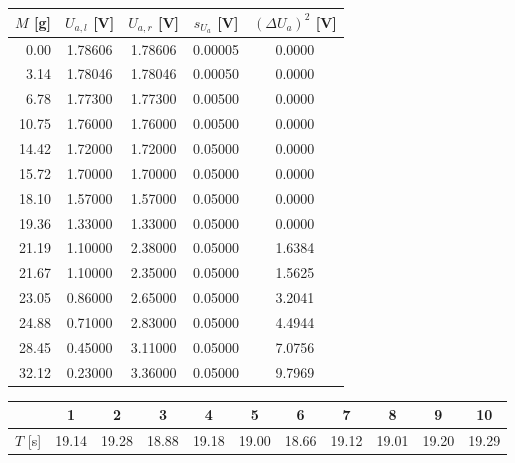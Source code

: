 \begin{center}
    \begin{tabular}{r|cccc}
        $M$ [g] &  $U_{a,l}$ [V] &  $U_{a,r}$ [V] &  $s_{U_a}$ [V] &  $(\Delta U_a)^2$ [V] \\
        \hline
         0.00 &  1.78606 &  1.78606 &  0.00005 &   0.0000 \\
         3.14 &  1.78046 &  1.78046 &  0.00050 &   0.0000 \\
         6.78 &  1.77300 &  1.77300 &  0.00500 &   0.0000 \\
        10.75 &  1.76000 &  1.76000 &  0.00500 &   0.0000 \\
        14.42 &  1.72000 &  1.72000 &  0.05000 &   0.0000 \\
        15.72 &  1.70000 &  1.70000 &  0.05000 &   0.0000 \\
        18.10 &  1.57000 &  1.57000 &  0.05000 &   0.0000 \\
        19.36 &  1.33000 &  1.33000 &  0.05000 &   0.0000 \\
        21.19 &  1.10000 &  2.38000 &  0.05000 &   1.6384 \\
        21.67 &  1.10000 &  2.35000 &  0.05000 &   1.5625 \\
        23.05 &  0.86000 &  2.65000 &  0.05000 &   3.2041 \\
        24.88 &  0.71000 &  2.83000 &  0.05000 &   4.4944 \\
        28.45 &  0.45000 &  3.11000 &  0.05000 &   7.0756 \\
        32.12 &  0.23000 &  3.36000 &  0.05000 &   9.7969 \\
    \end{tabular}
    \label{tab:gleichgewichtslage}
\end{center}
\begin{center}
    \begin{tabular}{ c | cccccccccc }
        {} & 1 & 2 & 3 &4 &5 &6 &7 &8 &9 &10\\
        \hline
        $T$ [s]&19.14&19.28&18.88&19.18&19.00&18.66&19.12&19.01&19.20&19.29\\
    \end{tabular}
    \label{tab:schwingung}
\end{center}